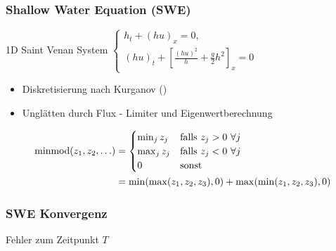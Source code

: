 \begin{frame}[<+->]
\frametitle{Shallow Water Equation (SWE)}
\begin{minipage}{0.45\linewidth}

\end{minipage}
\begin{minipage}{0.54\linewidth}
 \begin{block}{1D Saint Venan System}
     \centering
     $\begin{cases}
 h_t + (hu)_x = 0,\\
 (hu)_t + \left[\frac{(hu)^2}{h} + \frac{g}{2}h^2\right]_x = 0
\end{cases} $
    \end{block}
   \begin{itemize}
    \item Diskretisierung nach Kurganov (\cite{kurganov2007second})
    \item Unglätten durch Flux - Limiter und Eigenwertberechnung
   \end{itemize}                           
\end{minipage}
\pause
\begin{align*}
\operatorname{minmod}(z_1,z_2,\ldots) &= \begin{cases}
                                  \min_j z_j & \text{falls }z_j>0~\forall j\\
                                  \max_j z_j & \text{falls }z_j<0~\forall j\\
                                  0 & \text{sonst}
                                 \end{cases}\\
&= \min(\max(z_1,z_2,z_3),0) + \max(\min(z_1,z_2,z_3),0)                                 
\end{align*}
\end{frame}
% 
% 
% 
% 


\begin{frame}[<+->]
\frametitle{SWE Konvergenz}
\centering
\begin{minipage}{0.49\linewidth}

\end{minipage}
\begin{minipage}{0.49\linewidth}

\end{minipage}
\centering
Fehler zum Zeitpunkt $T$
\end{frame}

